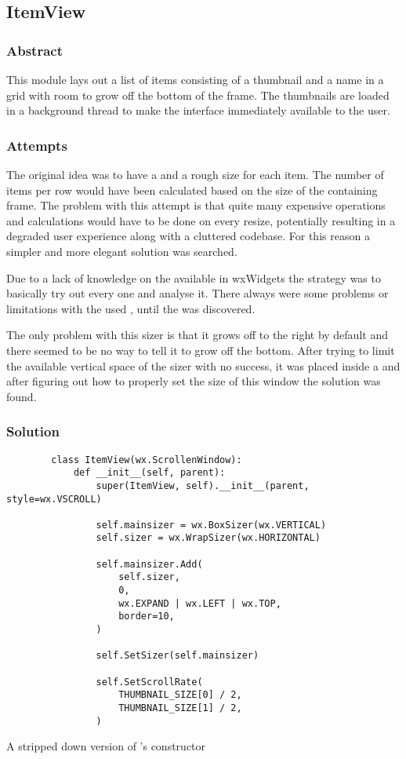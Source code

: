 \subsection{ItemView}
\def \kapitelautor {Clemens Stadlbauer}

\subsubsection{Abstract}
This module lays out a list of items consisting of a thumbnail and a name in a
grid with room to grow off the bottom of the frame. The thumbnails are loaded
in a background thread to make the interface immediately available to the user.

\subsubsection{Attempts}
The original idea was to have a  and a rough size for each
item. The number of items per row would have been calculated based on the size
of the containing frame. The problem with this attempt is that quite many
expensive operations and calculations would have to be done on every resize,
potentially resulting in a degraded user experience along with a cluttered
codebase. For this reason a simpler and more elegant solution was searched.

Due to a lack of knowledge on the available  in wxWidgets the
strategy was to basically try out every one and analyse it. There always were
some problems or limitations with the used , until the
 was discovered.

The only problem with this sizer is that it grows off to the right by default
and there seemed to be no way to tell it to grow off the bottom. After trying
to limit the available vertical space of the sizer with no success, it was
placed inside a  and after figuring out how to properly
set the size of this window the solution was found.

\subsubsection{Solution} %

\begin{listing}
	\begin{verbatim}
		class ItemView(wx.ScrollenWindow):
			def __init__(self, parent):
				super(ItemView, self).__init__(parent, style=wx.VSCROLL)

				self.mainsizer = wx.BoxSizer(wx.VERTICAL)
				self.sizer = wx.WrapSizer(wx.HORIZONTAL)

				self.mainsizer.Add(
					self.sizer,
					0,
					wx.EXPAND | wx.LEFT | wx.TOP,
					border=10,
				)

				self.SetSizer(self.mainsizer)

				self.SetScrollRate(
					THUMBNAIL_SIZE[0] / 2,
					THUMBNAIL_SIZE[1] / 2,
				)
	\end{verbatim}
	\caption{A stripped down version of 's constructor}
\end{listing}

